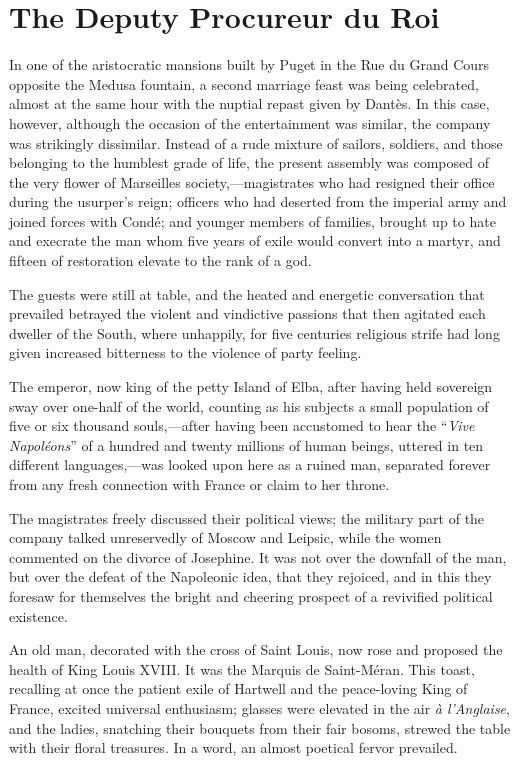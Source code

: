 \chapter{The Deputy Procureur du Roi}

In one of the aristocratic mansions built by Puget in the Rue du Grand
Cours opposite the Medusa fountain, a second marriage feast was being
celebrated, almost at the same hour with the nuptial repast given by
Dantès. In this case, however, although the occasion of the
entertainment was similar, the company was strikingly dissimilar.
Instead of a rude mixture of sailors, soldiers, and those belonging to
the humblest grade of life, the present assembly was composed of the
very flower of Marseilles society,—magistrates who had resigned their
office during the usurper’s reign; officers who had deserted from the
imperial army and joined forces with Condé; and younger members of
families, brought up to hate and execrate the man whom five years of
exile would convert into a martyr, and fifteen of restoration elevate
to the rank of a god.

The guests were still at table, and the heated and energetic
conversation that prevailed betrayed the violent and vindictive
passions that then agitated each dweller of the South, where unhappily,
for five centuries religious strife had long given increased bitterness
to the violence of party feeling.

The emperor, now king of the petty Island of Elba, after having held
sovereign sway over one-half of the world, counting as his subjects a
small population of five or six thousand souls,—after having been
accustomed to hear the “\textit{Vive Napoléons}” of a hundred and twenty
millions of human beings, uttered in ten different languages,—was
looked upon here as a ruined man, separated forever from any fresh
connection with France or claim to her throne.

The magistrates freely discussed their political views; the military
part of the company talked unreservedly of Moscow and Leipsic, while
the women commented on the divorce of Josephine. It was not over the
downfall of the man, but over the defeat of the Napoleonic idea, that
they rejoiced, and in this they foresaw for themselves the bright and
cheering prospect of a revivified political existence.

An old man, decorated with the cross of Saint Louis, now rose and
proposed the health of King Louis XVIII. It was the Marquis de
Saint-Méran. This toast, recalling at once the patient exile of
Hartwell and the peace-loving King of France, excited universal
enthusiasm; glasses were elevated in the air \textit{à l’Anglaise}, and the
ladies, snatching their bouquets from their fair bosoms, strewed the
table with their floral treasures. In a word, an almost poetical fervor
prevailed.

